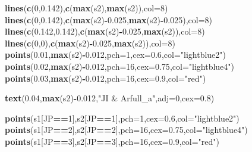 \documentclass[]{article}
\newenvironment{Shaded}{\begin{snugshade}}{\end{snugshade}}
\newcommand{\DataTypeTok}[1]{\textcolor[rgb]{0.13,0.29,0.53}{#1}}
\newcommand{\DecValTok}[1]{\textcolor[rgb]{0.00,0.00,0.81}{#1}}
\newcommand{\FloatTok}[1]{\textcolor[rgb]{0.00,0.00,0.81}{#1}}
\newcommand{\KeywordTok}[1]{\textcolor[rgb]{0.13,0.29,0.53}{\textbf{#1}}}
\newcommand{\NormalTok}[1]{#1}
\newcommand{\OperatorTok}[1]{\textcolor[rgb]{0.81,0.36,0.00}{\textbf{#1}}}
\newcommand{\StringTok}[1]{\textcolor[rgb]{0.31,0.60,0.02}{#1}}
\begin{document}
\begin{Shaded}
\begin{Highlighting}[]
\KeywordTok{lines}\NormalTok{(}\KeywordTok{c}\NormalTok{(}\DecValTok{0}\NormalTok{,}\FloatTok{0.142}\NormalTok{),}\KeywordTok{c}\NormalTok{(}\KeywordTok{max}\NormalTok{(s2),}\KeywordTok{max}\NormalTok{(s2)),}\DataTypeTok{col=}\DecValTok{8}\NormalTok{)}
\KeywordTok{lines}\NormalTok{(}\KeywordTok{c}\NormalTok{(}\DecValTok{0}\NormalTok{,}\FloatTok{0.142}\NormalTok{),}\KeywordTok{c}\NormalTok{(}\KeywordTok{max}\NormalTok{(s2)}\OperatorTok{-}\FloatTok{0.025}\NormalTok{,}\KeywordTok{max}\NormalTok{(s2)}\OperatorTok{-}\FloatTok{0.025}\NormalTok{),}\DataTypeTok{col=}\DecValTok{8}\NormalTok{)}
\KeywordTok{lines}\NormalTok{(}\KeywordTok{c}\NormalTok{(}\FloatTok{0.142}\NormalTok{,}\FloatTok{0.142}\NormalTok{),}\KeywordTok{c}\NormalTok{(}\KeywordTok{max}\NormalTok{(s2)}\OperatorTok{-}\FloatTok{0.025}\NormalTok{,}\KeywordTok{max}\NormalTok{(s2)),}\DataTypeTok{col=}\DecValTok{8}\NormalTok{)}
\KeywordTok{lines}\NormalTok{(}\KeywordTok{c}\NormalTok{(}\DecValTok{0}\NormalTok{,}\DecValTok{0}\NormalTok{),}\KeywordTok{c}\NormalTok{(}\KeywordTok{max}\NormalTok{(s2)}\OperatorTok{-}\FloatTok{0.025}\NormalTok{,}\KeywordTok{max}\NormalTok{(s2)),}\DataTypeTok{col=}\DecValTok{8}\NormalTok{)}
\KeywordTok{points}\NormalTok{(}\FloatTok{0.01}\NormalTok{,}\KeywordTok{max}\NormalTok{(s2)}\OperatorTok{-}\FloatTok{0.012}\NormalTok{,}\DataTypeTok{pch=}\DecValTok{1}\NormalTok{,}\DataTypeTok{cex=}\FloatTok{0.6}\NormalTok{,}\DataTypeTok{col=}\StringTok{"lightblue2"}\NormalTok{)}
\KeywordTok{points}\NormalTok{(}\FloatTok{0.02}\NormalTok{,}\KeywordTok{max}\NormalTok{(s2)}\OperatorTok{-}\FloatTok{0.012}\NormalTok{,}\DataTypeTok{pch=}\DecValTok{16}\NormalTok{,}\DataTypeTok{cex=}\FloatTok{0.75}\NormalTok{,}\DataTypeTok{col=}\StringTok{"lightblue4"}\NormalTok{)}
\KeywordTok{points}\NormalTok{(}\FloatTok{0.03}\NormalTok{,}\KeywordTok{max}\NormalTok{(s2)}\OperatorTok{-}\FloatTok{0.012}\NormalTok{,}\DataTypeTok{pch=}\DecValTok{16}\NormalTok{,}\DataTypeTok{cex=}\FloatTok{0.9}\NormalTok{,}\DataTypeTok{col=}\StringTok{"red"}\NormalTok{)}

\KeywordTok{text}\NormalTok{(}\FloatTok{0.04}\NormalTok{,}\KeywordTok{max}\NormalTok{(s2)}\OperatorTok{-}\FloatTok{0.012}\NormalTok{,}\StringTok{"JI & Arfull_a"}\NormalTok{,}\DataTypeTok{adj=}\DecValTok{0}\NormalTok{,}\DataTypeTok{cex=}\FloatTok{0.8}\NormalTok{)}

\KeywordTok{points}\NormalTok{(s1[JP}\OperatorTok{==}\DecValTok{1}\NormalTok{],s2[JP}\OperatorTok{==}\DecValTok{1}\NormalTok{],}\DataTypeTok{pch=}\DecValTok{1}\NormalTok{,}\DataTypeTok{cex=}\FloatTok{0.6}\NormalTok{,}\DataTypeTok{col=}\StringTok{"lightblue2"}\NormalTok{)}
\KeywordTok{points}\NormalTok{(s1[JP}\OperatorTok{==}\DecValTok{2}\NormalTok{],s2[JP}\OperatorTok{==}\DecValTok{2}\NormalTok{],}\DataTypeTok{pch=}\DecValTok{16}\NormalTok{,}\DataTypeTok{cex=}\FloatTok{0.75}\NormalTok{,}\DataTypeTok{col=}\StringTok{"lightblue4"}\NormalTok{)}
\KeywordTok{points}\NormalTok{(s1[JP}\OperatorTok{==}\DecValTok{3}\NormalTok{],s2[JP}\OperatorTok{==}\DecValTok{3}\NormalTok{],}\DataTypeTok{pch=}\DecValTok{16}\NormalTok{,}\DataTypeTok{cex=}\FloatTok{0.9}\NormalTok{,}\DataTypeTok{col=}\StringTok{"red"}\NormalTok{)}


\end{Highlighting}
\end{Shaded}
\end{document}
